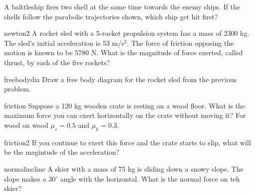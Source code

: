 \documentclass[letterpaper]{article}
\begin{document}
{\begin{question}{ }
A balttleship fires two shell at the same time towards the enemy ships. If the 
shells follow the parabolic trajectories shown, which ship get hit first?
\begin{choices}
\end{choices}
\end{question}

\begin{question}{newton2}
A rocket sled with a 5-rocket propulsion system has a mass of 2300 kg. The 
sled's initial acceleration is 53 m/s$^2$. The force of friction opposing 
the motion is known to be 5780 N. What is the magnitude of force exerted, 
called thrust, by each of the five rockets?  
\begin{choices}
\end{choices}
\end{question}
\begin{question}{freebodydia}
Draw a free body diagram for the rocket sled from the previous problem.
\end{question}



\begin{question}{friction}
Suppose a 120 kg wooden crate is resting on a wood floor.
What is the maximum force you can exert horizontally on the crate 
without moving it? For wood on wood $\mu_s=0.5$ and $\mu_k=0.3$.
\end{question}

\begin{question}{friction2}
If you continue to exert this force and the crate starts to slip, what 
will be the magintude of the acceleration? 
\begin{choices}
\end{choices}
\end{question}

\begin{question}{normalincline}
A skier with a mass of 75 kg is sliding down a snowy slope. The slope makes a 
30$^\circ$ angle with the horizontal.  What is the normal force on teh skier?
\end{question}
 

\cleardoublepage

~
}
\end{document}
